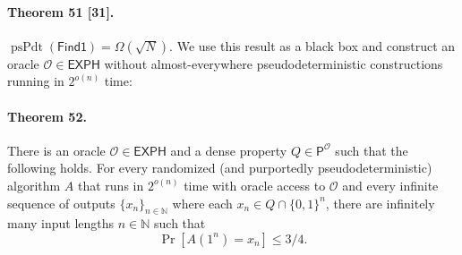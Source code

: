 \documentclass[10pt,a4paper]{article}
\begin{document}
\paragraph{Theorem 51 [31].} $\operatorname{psPdt}(\mathsf{Find1})=\Omega(\sqrt N)$.
We use this result as a black box and construct an oracle $\mathcal O\in\mathsf{EXPH}$ without almost-everywhere pseudodeterministic constructions running in $2^{o(n)}$ time:

\paragraph{Theorem 52.} There is an oracle $\mathcal O\in\mathsf{EXPH}$ and a dense property $Q\in\mathsf P^{\mathcal O}$ such that the following holds. For every randomized (and purportedly pseudodeterministic) algorithm $A$ that runs in $2^{o(n)}$ time with oracle access to $\mathcal O$ and every infinite sequence of outputs $\{x_n\}_{n\in\mathbb N}$ where each $x_n\in Q\cap\{0,1\}^n$, there are infinitely many input lengths $n\in\mathbb N$ such that
\[\Pr[A(1^n)=x_n]\leq3/4.\]
\end{document}
